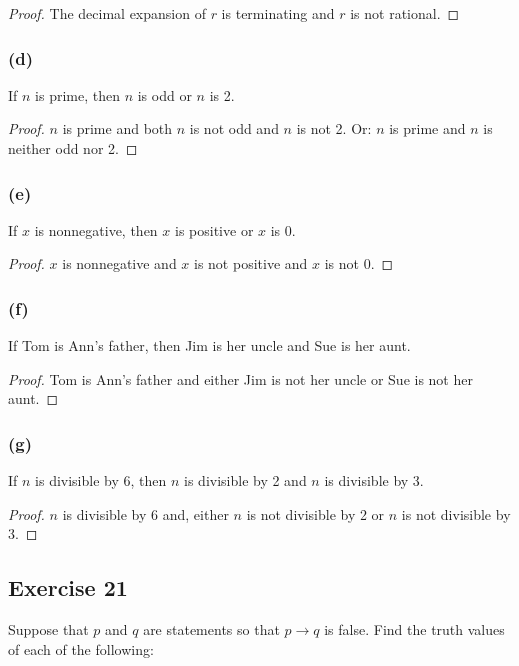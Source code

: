 \documentclass[14pt]{extarticle}
\begin{document}
\begin{proof}
The decimal expansion of $r$ is terminating and $r$ is not rational.
\end{proof}

\subsubsection{(d)}
If $n$ is prime, then $n$ is odd or $n$ is 2.

\begin{proof}
$n$ is prime and both $n$ is not odd and $n$ is not 2. Or: $n$ is prime and $n$
is neither odd nor 2.
\end{proof}

\subsubsection{(e)}
If $x$ is nonnegative, then $x$ is positive or $x$ is 0.

\begin{proof}
$x$ is nonnegative and $x$ is not positive and $x$ is not 0.
\end{proof}

\subsubsection{(f)}
If Tom is Ann’s father, then Jim is her uncle and Sue is her aunt.

\begin{proof}
Tom is Ann’s father and either Jim is not her uncle or Sue is not her aunt.
\end{proof}

\subsubsection{(g)}
If $n$ is divisible by 6, then $n$ is divisible by 2 and $n$ is divisible by 3.

\begin{proof}
$n$ is divisible by 6 and, either $n$ is not divisible by 2 or $n$ is not
divisible by 3.
\end{proof}

\subsection{Exercise 21}
Suppose that $p$ and $q$ are statements so that $p \to q$ is false. Find the
truth values of each of the following:
\end{document}

